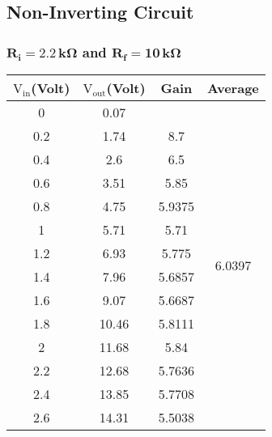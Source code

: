 \documentclass[12pt]{article}
\begin{document}
\subsection{Non-Inverting Circuit}
\subsubsection{$\mathbf{R_i = 2.2\, k \Omega}$ and $\mathbf{R_f = 10\, k \Omega}$}
\begin{table}[H]
	\centering
	\begin{tabular}{|c|c|c|c|}
		\hline
		$\mathrm{V_{in}}$(Volt) & $\mathrm{V_{out}}$(Volt) & Gain             & Average                            \\ \hline \hline
		0            & 0.07          &        & \multirow{14}{*}{6.0397} \\ \cline{1-3}
		0.2          & 1.74          & 8.7    &                          \\ \cline{1-3}
		0.4          & 2.6           & 6.5    &                          \\ \cline{1-3}
		0.6          & 3.51          & 5.85   &                          \\ \cline{1-3}
		0.8          & 4.75          & 5.9375 &                          \\ \cline{1-3}
		1            & 5.71          & 5.71   &                          \\ \cline{1-3}
		1.2          & 6.93          & 5.775  &                          \\ \cline{1-3}
		1.4          & 7.96          & 5.6857 &                          \\ \cline{1-3}
		1.6          & 9.07          & 5.6687 &                          \\ \cline{1-3}
		1.8          & 10.46         & 5.8111 &                          \\ \cline{1-3}
		2            & 11.68         & 5.84   &                          \\ \cline{1-3}
		2.2          & 12.68         & 5.7636 &                          \\ \cline{1-3}
		2.4          & 13.85         & 5.7708 &                          \\ \cline{1-3}
		2.6          & 14.31         & 5.5038 &                          \\ \hline
	\end{tabular}
\end{table}
\end{document}
